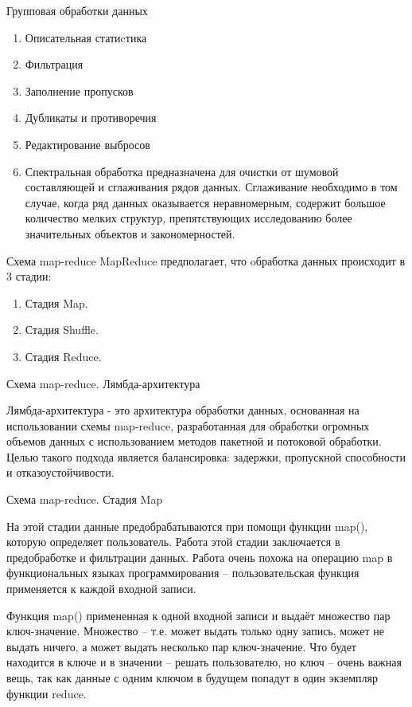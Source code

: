 \documentclass{beamer}
\begin{document}
\begin{frame}{Групповая обработки данных} 
\begin{enumerate}
\item Описательная статиcтика 
\item Фильтрация 
\item Заполнение пропусков
\item Дубликаты и противоречия
\item Редактирование выбросов 
\item Спектральная обработка предназначена для очистки от шумовой составляющей и сглаживания рядов данных. Сглаживание необходимо в том случае, когда ряд данных оказывается неравномерным, содержит большое количество мелких структур, препятствующих исследованию более значительных объектов и закономерностей. 


\end{enumerate}




\end{frame}




\begin{frame}{Схема map-reduce} 
MapReduce предполагает, что oбработка данных происходит в 3 стадии:
\begin{enumerate}

\item  Стадия Map.
\item   Стадия Shuffle.
\item   Стадия Reduce.
\end{enumerate}

\end{frame}

\begin{frame}{Схема map-reduce. Лямбда-архитектура  } 

Лямбда-архитектура - это архитектура обработки данных, основанная на  использовании схемы map-reduce, 
разработанная для обработки огромных объемов данных с использованием методов 
пакетной и потоковой обработки.
Целью такого  подхода  является балансировка:  задержки, 
пропускной способности и отказоустойчивости. 
\end{frame}

\begin{frame}{Схема map-reduce. Стадия Map} 

    На этой стадии данные предобрабатываются при помощи функции map(), которую определяет пользователь. 
    Работа этой стадии заключается в предобработке и фильтрации данных. 
    Работа очень похожа на операцию map в функциональных языках программирования – 
    пользовательская функция применяется к каждой входной записи.

Функция map() примененная к одной входной записи и 
выдаёт множество пар ключ-значение. Множество – т.е. может выдать только одну запись, 
может не выдать ничего, а может выдать несколько пар ключ-значение. 
Что будет находится в ключе и в значении – решать пользователю, 
но ключ – очень важная вещь, 
так как данные с одним ключом в будущем попадут в один экземпляр функции reduce.

\end{frame}
\end{document}
